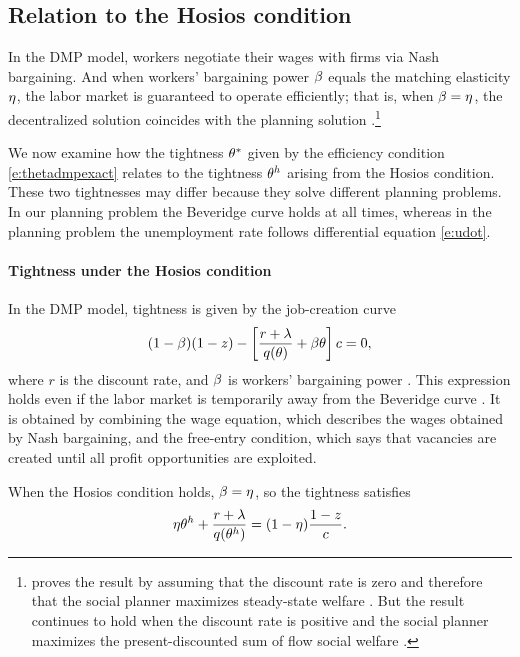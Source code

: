 \documentclass[letterpaper,12pt,leqno]{article}
\begin{document}
\subsection{Relation to the Hosios condition}

In the DMP model, workers negotiate their wages with firms via Nash bargaining. And when workers' bargaining power $\beta$ equals the matching elasticity $\eta$, the labor market is guaranteed to operate efficiently; that is, when $\beta=\eta$, the decentralized solution coincides with the planning solution .\footnote{ proves the result by assuming that the discount rate is zero and therefore that the social planner maximizes steady-state welfare . But the result continues to hold when the discount rate is positive and the social planner maximizes the present-discounted sum of flow social welfare .}

We now examine how the tightness $\theta^*$ given by the efficiency condition \eqref{e:thetadmpexact} relates to the tightness $\theta^h$ arising from the Hosios condition. These two tightnesses may differ because they solve different planning problems. In our planning problem the Beveridge curve holds at all times, whereas in the  planning problem the unemployment rate follows differential equation \eqref{e:udot}.

\paragraph{Tightness under the Hosios condition} In the DMP model, tightness is given by the job-creation curve
\begin{equation}
(1-\beta)(1-z) - \left[ \frac{r+\lambda}{q(\theta)} + \beta\theta \right] c = 0,
\label{e:jobcreation}\end{equation}
where $r$ is the discount rate, and $\beta$ is workers' bargaining power . This expression holds even if the labor market is temporarily away from the Beveridge curve . It is obtained by combining the wage equation, which describes the wages obtained by Nash bargaining, and the free-entry condition, which says that vacancies are created until all profit opportunities are exploited.

When the Hosios condition holds, $\beta=\eta$, so the tightness satisfies
\begin{equation}
\eta\theta^h + \frac{r+\lambda}{q(\theta^h)} = (1-\eta)\frac{1-z}{c}.
\label{e:thetahosios}\end{equation}
\end{document}
